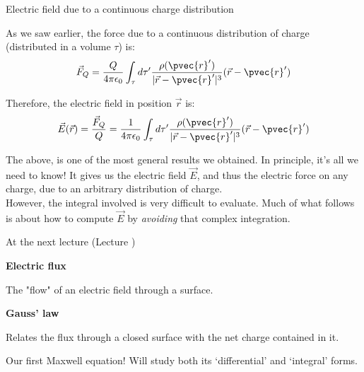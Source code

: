 %
%
%

\begin{frame}{Electric field due to a continuous charge distribution}

As we saw earlier, the force due to a continuous distribution of charge (distributed in a volume $\tau$) is:
\begin{equation*}
   \vec{F}_{Q} = \frac{Q}{4\pi\epsilon_0} \int_{\tau}
      d\tau^{\prime} \frac{\rho({\pvec{r}'})}{|\vec{r}-\pvec{r}'|^{3}} (\vec{r}-\pvec{r}')
\end{equation*}

Therefore, the electric field in position $\vec{r}$ is:
\begin{equation*}
   \vec{E}(\vec{r}) = \frac{\vec{F}_{Q}}{Q} = \frac{1}{4\pi\epsilon_0} \int_{\tau}
      d\tau^{\prime} \frac{\rho({\pvec{r}'})}{|\vec{r}-\pvec{r}'|^{3}} (\vec{r}-\pvec{r}')
\end{equation*}

The above, is one of the most general results we obtained. In principle, it's all we need to know!
It gives us the electric field $\vec{E}$, and thus the electric force on any charge,
due to an arbitrary distribution of charge.\\

\vspace{0.2cm}
However, the integral involved is very difficult to evaluate.
Much of what follows is about how to compute $\vec{E}$ by {\em avoiding} that complex integration.

\end{frame}




%
%

\renewcommand{\lecturesummarytitle}{Main points to remember }


%
%

\begin{frame}{At the next lecture (Lecture \nextlecture)}

  \begin{itemize}
  {\small
  \item {\bf Electric flux}
    \begin{itemize}
    {\scriptsize
       \item The "flow" of an electric field through a surface.
    }
    \end{itemize}

  \item {\bf Gauss' law}
    \begin{itemize}
    {\scriptsize
       \item Relates the flux through a closed surface with the net charge contained in it.
       \item Our first Maxwell equation! Will study both its `differential' and `integral' forms.
    }
    \end{itemize}
  }
  \end{itemize}

\end{frame}
